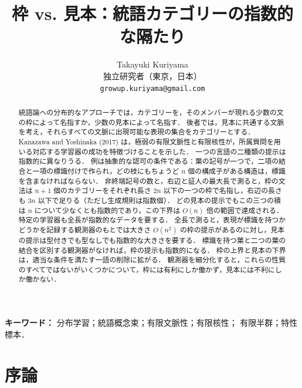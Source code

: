\documentclass[11pt,a4paper]{ltjsarticle}
\title{枠 vs. 見本：統語カテゴリーの指数的な隔たり}
\author{Takayuki Kuriyama\\
独立研究者（東京，日本）\\
\texttt{growup.kuriyama@gmail.com}}
\date{}
\numberwithin{equation}{section}
\theoremstyle{plain}
\theoremstyle{definition}
\theoremstyle{remark}
\theoremstyle{plain}
\begin{document}
\linenumbers
\maketitle

\begin{abstract}
統語論への分布的なアプローチでは，カテゴリーを，そのメンバーが現れる少数の文の枠によって名指すか，少数の見本によって名指す．
後者では，見本に共通する文脈を考え，それらすべての文脈に出現可能な表現の集合をカテゴリーとする．
Kanazawa and Yoshinaka (2017) は，極弱の有限文脈性と有限核性が，所属質問を用いる対応する学習器の成功を特徴づけることを示した．
一つの言語の二種類の提示は指数的に異なりうる．
例は抽象的な認可の条件である：葉の記号が一つで，二項の結合と一項の標識付けで作られ，どの枝にもちょうど $n$ 個の構成子がある構造は，標識を含まなければならない．
非終端記号の数と，右辺と証人の最大長で測ると，枠の文法は $n+1$ 個のカテゴリーをそれぞれ長さ $2n$ 以下の一つの枠で名指し，右辺の長さも $3n$ 以下で足りる（ただし生成規則は指数個）．
どの見本の提示でもこの三つの積は $n$ について少なくとも指数的であり，この下界は $O(n)$ 倍の範囲で達成される．
特定の学習器も全長が指数的なデータを要する．
全長で測ると，表現が標識を持つかどうかを記録する観測器のもとでは大きさ $O(n^2)$ の枠の提示があるのに対し，見本の提示は型付きでも型なしでも指数的な大きさを要する．
標識を持つ葉と二つの葉の結合を区別する観測器がなければ，枠の提示も指数的になる．
枠の上界と見本の下界は，適当な条件を満たす一語の削除に拡がる．
観測器を細分化すると，これらの性質のすべてではないがいくつかについて，枠には有利にしか働かず，見本には不利にしか働かない．
\end{abstract}

\noindent\textbf{キーワード：} 分布学習；統語概念束；有限文脈性；有限核性；
有限半群；特性標本．

\section{序論}\label{sec:intro}
\end{document}
